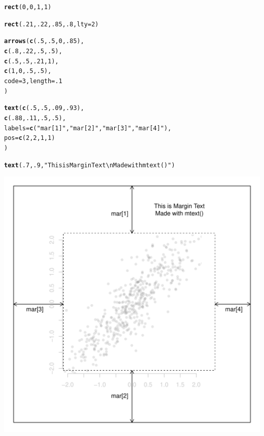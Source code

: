 \documentclass{tufte-book}\usepackage[]{graphicx}\usepackage[]{color}
\makeatletter
\def\maxwidth{ %
  \ifdim\Gin@nat@width>\linewidth
    \linewidth
  \else
    \Gin@nat@width
  \fi
}
\newcommand{\hlnum}[1]{\textcolor[rgb]{0.686,0.059,0.569}{#1}}%
\newcommand{\hlstr}[1]{\textcolor[rgb]{0.192,0.494,0.8}{#1}}%
\newcommand{\hlstd}[1]{\textcolor[rgb]{0.345,0.345,0.345}{#1}}%
\newcommand{\hlkwc}[1]{\textcolor[rgb]{0.333,0.667,0.333}{#1}}%
\newcommand{\hlkwd}[1]{\textcolor[rgb]{0.737,0.353,0.396}{\textbf{#1}}}%
\newenvironment{kframe}{%
 \def\at@end@of@kframe{}%
 \ifinner\ifhmode%
  \def\at@end@of@kframe{\end{minipage}}%
  \begin{minipage}{\columnwidth}%
 \fi\fi%
 \def\FrameCommand##1{\hskip\@totalleftmargin \hskip-\fboxsep
 \colorbox{shadecolor}{##1}\hskip-\fboxsep
     \hskip-\linewidth \hskip-\@totalleftmargin \hskip\columnwidth}%
 \MakeFramed {\advance\hsize-\width
   \@totalleftmargin\z@ \linewidth\hsize
   \@setminipage}}%
 {\par\unskip\endMakeFramed%
 \at@end@of@kframe}
\newenvironment{knitrout}{}{} %
\makeatother
\begin{document}
\begin{marginfigure}
\begin{tiny}
\begin{knitrout}
\begin{kframe}
\begin{alltt}
\hlkwd{rect}\hlstd{(}\hlnum{0}\hlstd{,} \hlnum{0}\hlstd{,} \hlnum{1}\hlstd{,} \hlnum{1}\hlstd{)}

\hlkwd{rect}\hlstd{(}\hlnum{.21}\hlstd{,} \hlnum{.22}\hlstd{,} \hlnum{.85}\hlstd{,} \hlnum{.8}\hlstd{,} \hlkwc{lty} \hlstd{=} \hlnum{2}\hlstd{)}

\hlkwd{arrows}\hlstd{(}\hlkwd{c}\hlstd{(}\hlnum{.5}\hlstd{,} \hlnum{.5}\hlstd{,} \hlnum{0}\hlstd{,} \hlnum{.85}\hlstd{),}
       \hlkwd{c}\hlstd{(}\hlnum{.8}\hlstd{,} \hlnum{.22}\hlstd{,} \hlnum{.5}\hlstd{,} \hlnum{.5}\hlstd{),}
       \hlkwd{c}\hlstd{(}\hlnum{.5}\hlstd{,} \hlnum{.5}\hlstd{,} \hlnum{.21}\hlstd{,} \hlnum{1}\hlstd{),}
       \hlkwd{c}\hlstd{(}\hlnum{1}\hlstd{,} \hlnum{0}\hlstd{,} \hlnum{.5}\hlstd{,} \hlnum{.5}\hlstd{),}
       \hlkwc{code} \hlstd{=} \hlnum{3}\hlstd{,} \hlkwc{length} \hlstd{=} \hlnum{.1}
       \hlstd{)}

\hlkwd{text}\hlstd{(}\hlkwd{c}\hlstd{(}\hlnum{.5}\hlstd{,} \hlnum{.5}\hlstd{,} \hlnum{.09}\hlstd{,} \hlnum{.93}\hlstd{),}
     \hlkwd{c}\hlstd{(}\hlnum{.88}\hlstd{,} \hlnum{.11}\hlstd{,} \hlnum{.5}\hlstd{,} \hlnum{.5}\hlstd{),}
     \hlkwc{labels} \hlstd{=} \hlkwd{c}\hlstd{(}\hlstr{"mar[1]"}\hlstd{,} \hlstr{"mar[2]"}\hlstd{,} \hlstr{"mar[3]"}\hlstd{,} \hlstr{"mar[4]"}\hlstd{),}
     \hlkwc{pos} \hlstd{=} \hlkwd{c}\hlstd{(}\hlnum{2}\hlstd{,} \hlnum{2}\hlstd{,} \hlnum{1}\hlstd{,} \hlnum{1}\hlstd{)}
     \hlstd{)}

\hlkwd{text}\hlstd{(}\hlnum{.7}\hlstd{,} \hlnum{.9}\hlstd{,} \hlstr{"This is Margin Text\textbackslash{}nMade with mtext()"}\hlstd{)}
\end{alltt}
\end{kframe}
\includegraphics[width=\maxwidth]{figure/unnamed-chunk-233-1} 

\end{knitrout}
\end{tiny}
\label{fig:marplot}
\end{marginfigure}
\end{document}
